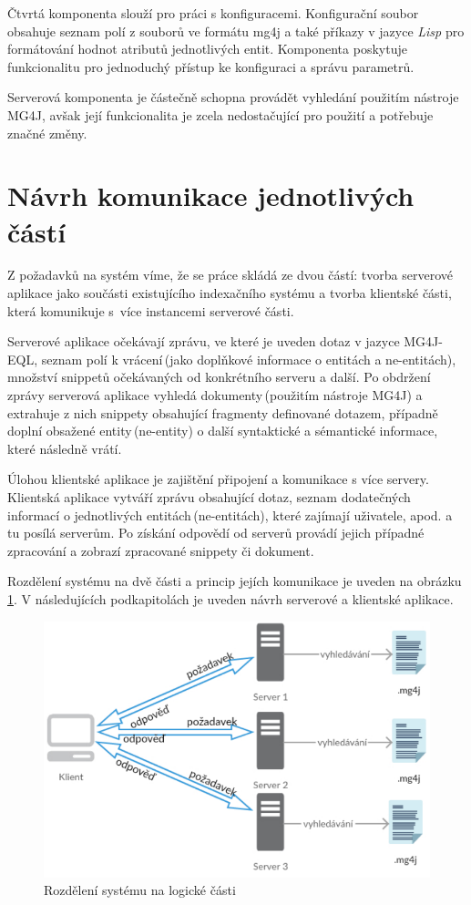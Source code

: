 Čtvrtá komponenta slouží pro práci s konfiguracemi. Konfigurační soubor obsahuje seznam polí z souborů ve formátu mg4j a také příkazy v jazyce \emph{Lisp} pro formátování hodnot atributů jednotlivých entit. Komponenta poskytuje funkcionalitu pro jednoduchý přístup ke konfiguraci a správu parametrů.


Serverová komponenta je částečně schopna provádět vyhledání použitím nástroje MG4J, avšak její funkcionalita je zcela nedostačující pro použití a potřebuje značné změny.



\section{Návrh komunikace jednotlivých částí}
Z požadavků na systém víme, že se práce skládá ze dvou částí: tvorba serverové aplikace jako součásti existujícího indexačního systému a tvorba klientské části, která komunikuje s~více instancemi serverové části.    

Serverové aplikace očekávají zprávu, ve které je uveden dotaz v jazyce MG4J-EQL, seznam polí k vrácení\,(jako doplňkové informace o entitách a ne-entitách), množství snippetů očekávaných od konkrétního serveru a další. Po obdržení zprávy  serverová aplikace vyhledá dokumenty\,(použitím  nástroje MG4J) a extrahuje z nich snippety obsahující fragmenty definované dotazem, případně doplní obsažené entity\,(ne-entity) o další syntaktické a sémantické informace, které následně vrátí. 


Úlohou klientské aplikace je zajištění připojení a komunikace s více servery. Klientská aplikace vytváří zprávu obsahující dotaz, seznam dodatečných informací o jednotlivých entitách\,(ne-entitách), které zajímají uživatele, apod. a tu posílá serverům. Po získání odpovědí od serverů provádí jejich případné zpracování a zobrazí zpracované snippety či dokument. 

Rozdělení systému na dvě části a princip jejích komunikace je uveden na obrázku \ref{ClientServerSimpleLbl}. V následujících podkapitolách je uveden návrh serverové a klientské aplikace.   

\begin{figure}
	\includegraphics[scale=0.5]{obrazky-figures/ClientServerSimple.png}
    \caption{Rozdělení systému na logické části}
    \label{ClientServerSimpleLbl}
\end{figure}




